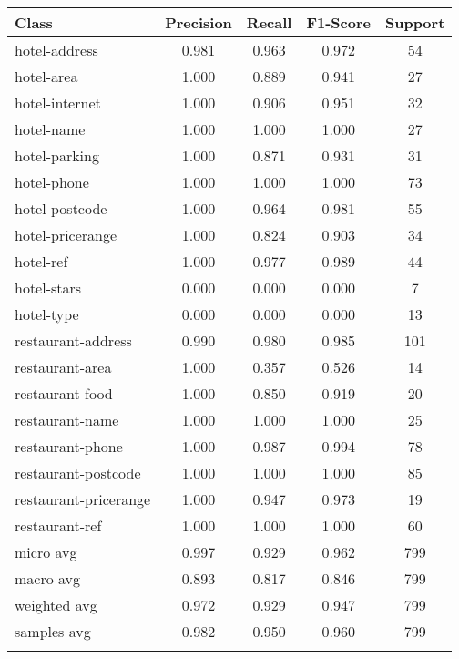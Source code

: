 
\begin{table}[h]
\centering

\begin{tabular}{|l|c|c|c|c|}
\hline
\textbf{Class}& \textbf{Precision} & \textbf{Recall} & \textbf{F1-Score} & \textbf{Support} \\ \hline
hotel-address & 0.981 & 0.963 & 0.972 & 54 \\ \hline
hotel-area & 1.000 & 0.889 & 0.941 & 27 \\ \hline
hotel-internet & 1.000 & 0.906 & 0.951 & 32 \\ \hline
hotel-name & 1.000 & 1.000 & 1.000 & 27 \\ \hline
hotel-parking & 1.000 & 0.871 & 0.931 & 31 \\ \hline
hotel-phone & 1.000 & 1.000 & 1.000 & 73 \\ \hline
hotel-postcode & 1.000 & 0.964 & 0.981 & 55 \\ \hline
hotel-pricerange & 1.000 & 0.824 & 0.903 & 34 \\ \hline
hotel-ref & 1.000 & 0.977 & 0.989 & 44 \\ \hline
hotel-stars & 0.000 & 0.000 & 0.000 & 7 \\ \hline
hotel-type & 0.000 & 0.000 & 0.000 & 13 \\ \hline
restaurant-address & 0.990 & 0.980 & 0.985 & 101 \\ \hline
restaurant-area & 1.000 & 0.357 & 0.526 & 14 \\ \hline
restaurant-food & 1.000 & 0.850 & 0.919 & 20 \\ \hline
restaurant-name & 1.000 & 1.000 & 1.000 & 25 \\ \hline
restaurant-phone & 1.000 & 0.987 & 0.994 & 78 \\ \hline
restaurant-postcode & 1.000 & 1.000 & 1.000 & 85 \\ \hline
restaurant-pricerange & 1.000 & 0.947 & 0.973 & 19 \\ \hline
restaurant-ref & 1.000 & 1.000 & 1.000 & 60 \\ \hline\hline
micro avg & 0.997 & 0.929 & 0.962 & 799 \\ \hline
macro avg & 0.893 & 0.817 & 0.846 & 799 \\ \hline
weighted avg & 0.972 & 0.929 & 0.947 & 799 \\ \hline
samples avg & 0.982 & 0.950 & 0.960 & 799 \\ \hline
\multicolumn{5}{c}{}\\ \hline


\end{tabular}
\end{table}
